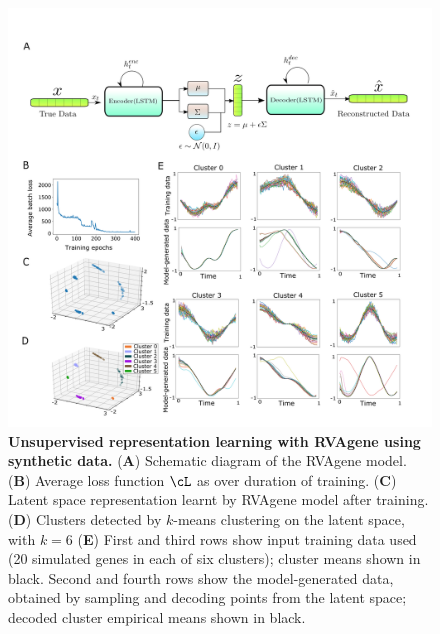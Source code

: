 {\centering
\begin{figure}
  \includegraphics[width=\linewidth]{figures/fig2.png}
    \caption[Unsupervised representation learning with RVAgene using synthetic data.]{\textbf{Unsupervised representation learning with RVAgene using synthetic data.} ({\bf A}) Schematic diagram of the RVAgene model. ({\bf B}) Average loss function $\cL$ as over duration of training.
    ({\bf C}) Latent space representation learnt by RVAgene model after training.
    ({\bf D}) Clusters detected by $k$-means clustering on the latent space, with $k=6$
    ({\bf E}) First and third rows show input training data used (20 simulated genes in each of six clusters); cluster means shown in black. Second and fourth rows show the model-generated data, obtained by sampling and decoding points from the latent space; decoded cluster empirical means shown in black.} 
 \label{fig:fig2}
\end{figure}
}
